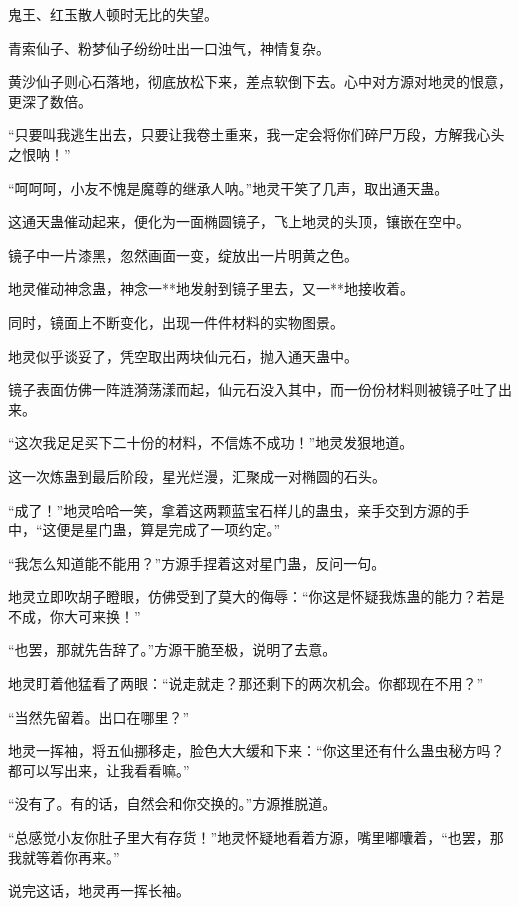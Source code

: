 
\begin{this_body}

鬼王、红玉散人顿时无比的失望。

青索仙子、粉梦仙子纷纷吐出一口浊气，神情复杂。

黄沙仙子则心石落地，彻底放松下来，差点软倒下去。心中对方源对地灵的恨意，更深了数倍。

“只要叫我逃生出去，只要让我卷土重来，我一定会将你们碎尸万段，方解我心头之恨呐！”

“呵呵呵，小友不愧是魔尊的继承人呐。”地灵干笑了几声，取出通天蛊。

这通天蛊催动起来，便化为一面椭圆镜子，飞上地灵的头顶，镶嵌在空中。

镜子中一片漆黑，忽然画面一变，绽放出一片明黄之色。

地灵催动神念蛊，神念一**地发射到镜子里去，又一**地接收着。

同时，镜面上不断变化，出现一件件材料的实物图景。

地灵似乎谈妥了，凭空取出两块仙元石，抛入通天蛊中。

镜子表面仿佛一阵涟漪荡漾而起，仙元石没入其中，而一份份材料则被镜子吐了出来。

“这次我足足买下二十份的材料，不信炼不成功！”地灵发狠地道。

这一次炼蛊到最后阶段，星光烂漫，汇聚成一对椭圆的石头。

“成了！”地灵哈哈一笑，拿着这两颗蓝宝石样儿的蛊虫，亲手交到方源的手中，“这便是星门蛊，算是完成了一项约定。”

“我怎么知道能不能用？”方源手捏着这对星门蛊，反问一句。

地灵立即吹胡子瞪眼，仿佛受到了莫大的侮辱：“你这是怀疑我炼蛊的能力？若是不成，你大可来换！”

“也罢，那就先告辞了。”方源干脆至极，说明了去意。

地灵盯着他猛看了两眼：“说走就走？那还剩下的两次机会。你都现在不用？”

“当然先留着。出口在哪里？”

地灵一挥袖，将五仙挪移走，脸色大大缓和下来：“你这里还有什么蛊虫秘方吗？都可以写出来，让我看看嘛。”

“没有了。有的话，自然会和你交换的。”方源推脱道。

“总感觉小友你肚子里大有存货！”地灵怀疑地看着方源，嘴里嘟囔着，“也罢，那我就等着你再来。”

说完这话，地灵再一挥长袖。


\end{this_body}
